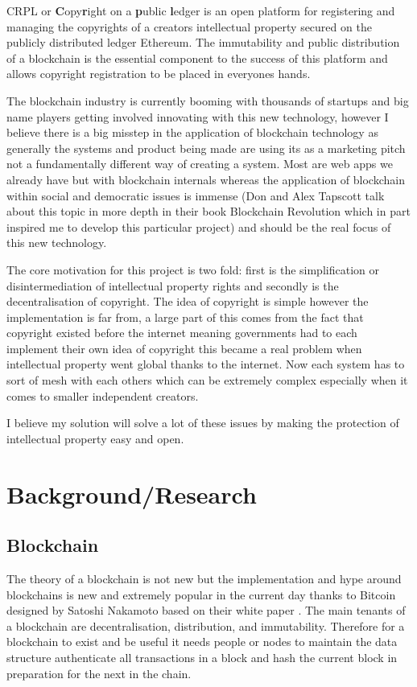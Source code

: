 \documentclass[12pt]{report}
\begin{document}
CRPL or \textbf{C}opy\textbf{r}ight on a \textbf{p}ublic \textbf{l}edger is an open platform for registering and managing the copyrights of a creators intellectual property secured on the publicly distributed ledger Ethereum. The immutability and public distribution of a blockchain is the essential component to the success of this platform and allows copyright registration to be placed in everyones hands.

The blockchain industry is currently booming with thousands of startups and big name players getting involved innovating with this new technology, however I believe there is a big misstep in the application of blockchain technology as generally the systems and product being made are using its as a marketing pitch not a fundamentally different way of creating a system. Most are web apps we already have but with blockchain internals whereas the application of blockchain within social and democratic issues is immense (Don and Alex Tapscott talk about this topic in more depth in their book Blockchain Revolution\cite{blockchain_revolution} which in part inspired me to develop this particular project) and should be the real focus of this new technology.

The core motivation for this project is two fold: first is the simplification or disintermediation of intellectual property rights and secondly is the decentralisation of copyright. The idea of copyright is simple however the implementation is far from, a large part of this comes from the fact that copyright existed before the internet meaning governments had to each implement their own idea of copyright this became a real problem when intellectual property went global thanks to the internet. Now each system has to sort of mesh with each others which can be extremely complex especially when it comes to smaller independent creators.

I believe my solution will solve a lot of these issues by making the protection of intellectual property easy and open.

\chapter{Background/Research}

\section{Blockchain}

The theory of a blockchain is not new \cite{origins_blockchain} but the implementation and hype around blockchains is new and extremely popular in the current day thanks to Bitcoin designed by Satoshi Nakamoto based on their white paper \cite{nakamoto2008bitcoin}. The main tenants of a blockchain are decentralisation, distribution, and immutability. Therefore for a blockchain to exist and be useful it needs people or nodes to maintain the data structure authenticate all transactions in a block and hash the current block in preparation for the next in the chain.
\end{document}
